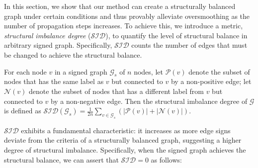 In this section, we show that our method \ours can create a structurally balanced graph under certain conditions and thus provably alleviate oversmoothing as the number of propagation steps increases. 
To achieve this, we introduce a metric,  \textit{structural imbalance degree} ($\mathcal{SID}$), to quantify the level of structural balance in arbitrary signed graph.
 Specifically, $\mathcal{SID}$ counts the number of edges that must be changed to achieve the structural balance. 
\begin{definition}
    For each node $v$ in a signed graph $\mathcal{G}_s$ of $n$ nodes, let $\mathcal{P}(v)$ denote the subset of nodes that has the same label as $v$ but connected to $v$ by a non-positive edge; let $\mathcal{N}(v)$ denote the subset of nodes that has a different label from $v$ but connected to $v$ by a non-negative edge. Then the structural imbalance degree of $\mathcal{G}$ is defined as $\mathcal{SID}(\mathcal{G}_s) = \frac{1}{2n}\sum_{v\in\mathcal{G}_s}(|\mathcal{P}(v)| + |\mathcal{N}(v)|)$.
\end{definition}
$\mathcal{SID}$ exhibits a fundamental characteristic: it increases as more edge signs deviate from the criteria of a structurally balanced graph, suggesting a higher degree of structural imbalance. Specifically, when the signed graph achieves the structural balance, we can assert that $\mathcal{SID}=0$ as follows:

